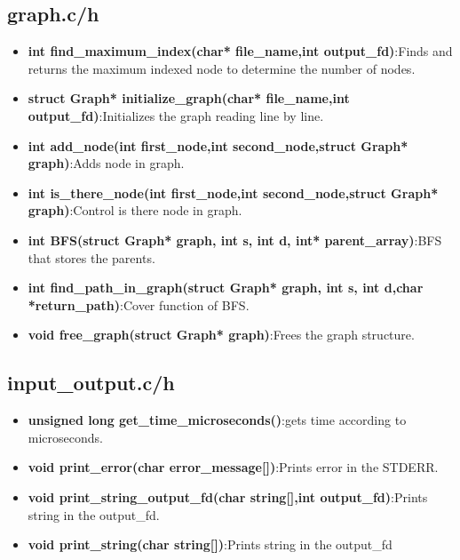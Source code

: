 \documentclass{article}
\begin{document}
\subsection{graph.c/h}
\begin{itemize}
    \item \textbf{int find\_maximum\_index(char* file\_name,int output\_fd)}:Finds and returns the maximum indexed node to determine the number of nodes.
    \item \textbf{struct Graph* initialize\_graph(char* file\_name,int output\_fd)}:Initializes the graph reading line by line.
    \item \textbf{int add\_node(int first\_node,int second\_node,struct Graph* graph)}:Adds node in graph.
    \item \textbf{int is\_there\_node(int first\_node,int second\_node,struct Graph* graph)}:Control is there node in graph.
    \item \textbf{int BFS(struct Graph* graph, int s, int d, int* parent\_array)}:BFS that stores the parents.
    \item \textbf{int find\_path\_in\_graph(struct Graph* graph, int s, int d,char *return\_path)}:Cover function of BFS.
    \item \textbf{void free\_graph(struct Graph* graph)}:Frees the graph structure.
    
\end{itemize}

\subsection{input\_output.c/h}
\begin{itemize}
    \item \textbf{unsigned long get\_time\_microseconds()}:gets time according to microseconds.
    \item \textbf{void print\_error(char error\_message[])}:Prints error in the STDERR.
    \item \textbf{void print\_string\_output\_fd(char string[],int output\_fd)}:Prints string in the output\_fd.
    \item \textbf{void print\_string(char string[])}:Prints string in the output\_fd 
    
\end{itemize}
\end{document}
